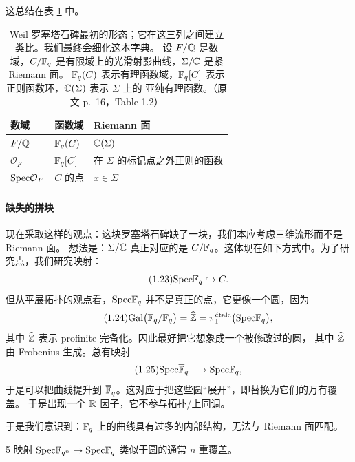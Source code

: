 这总结在表 \ref{tab:1-2} 中。

\begin{table}[htbp]
  \centering
  \caption{Weil 罗塞塔石碑最初的形态；它在这三列之间建立类比。我们最终会细化这本字典。
    设 $F/\mathbb{Q}$ 是数域，$C/\mathbb{F}_q$ 是有限域上的光滑射影曲线，$\Sigma/\mathbb{C}$ 是紧 Riemann 面。
    $\mathbb{F}_q(C)$ 表示有理函数域，$\mathbb{F}_q[C]$ 表示正则函数环，$\mathbb{C}(\Sigma)$ 表示 $\Sigma$ 上的
    亚纯有理函数。（原文 p.~16，Table 1.2）}
  \label{tab:1-2}
  \begin{tabular}{lll}
    \toprule
    数域 & 函数域 & Riemann 面\\
    \midrule
    $F/\mathbb{Q}$ & $\mathbb{F}_q(C)$ & $\mathbb{C}(\Sigma)$\\
    $\mathcal{O}_F$ & $\mathbb{F}_q[C]$ & 在 $\Sigma$ 的标记点之外正则的函数\\
    $\mathrm{Spec}\mathcal{O}_F$ & $C$ 的点 & $x\in\Sigma$\\
    \bottomrule
  \end{tabular}
\end{table}

\paragraph{缺失的拼块}
现在采取这样的观点：这块罗塞塔石碑缺了一块，我们本应考虑三维流形而不是 Riemann 面。
想法是：$\Sigma/\mathbb{C}$ 真正对应的是 $C/\mathbb{F}_q$。这体现在如下方式中。为了研究点，我们研究映射：
\begin{equation}\tag{1.23}\label{eq:1.23}
\mathrm{Spec}\mathbb{F}_q\hookrightarrow C.
\end{equation}
但从平展拓扑的观点看，$\mathrm{Spec}\mathbb{F}_q$ 并不是真正的点，它更像一个圆，因为
\begin{equation}\tag{1.24}\label{eq:1.24}
\mathrm{Gal}\bigl(\overline{\mathbb{F}}_q/\mathbb{F}_q\bigr)
  =\widehat{\mathbb{Z}}=\pi_1^{\text{étale}}\bigl(\mathrm{Spec}\mathbb{F}_q\bigr),
\end{equation}
其中 $\widehat{\mathbb{Z}}$ 表示 profinite 完备化。因此最好把它想象成一个被修改过的圆，
其中 $\widehat{\mathbb{Z}}$ 由 Frobenius 生成。总有映射
\begin{equation}\tag{1.25}\label{eq:1.25}
\mathrm{Spec}\overline{\mathbb{F}}_q\longrightarrow\mathrm{Spec}\mathbb{F}_q,
\end{equation}
于是可以把曲线提升到 $\overline{\mathbb{F}}_q$。这对应于把这些圆“展开”，即替换为它们的万有覆盖。
于是出现一个 $\mathbb{R}$ 因子，它不参与拓扑/上同调。

于是我们意识到：$\mathbb{F}_q$ 上的曲线具有过多的内部结构，无法与 Riemann 面匹配。

\begin{srcrem}{5}
映射 $\mathrm{Spec}\mathbb{F}_{q^n}\to\mathrm{Spec}\mathbb{F}_q$ 类似于圆的通常 $n$ 重覆盖。
\end{srcrem}

